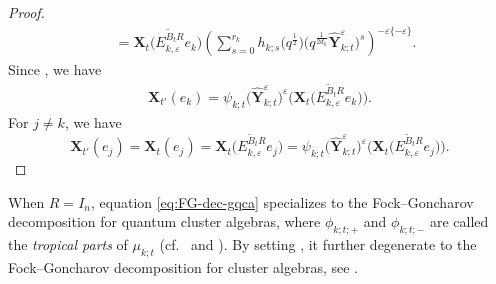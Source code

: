 \documentclass[10pt,a4paper]{amsart}
\numberwithin{equation}{section}
\begin{document}
\begin{proof}
\begin{align*}
 &=\mathbf{X}_{t}\bigl(E^{\tilde{B}_{t}R}_{k,\varepsilon}e_{k}\bigr)\left(\sum\limits^{r_{k}}_{s=0}h_{k;s}\bigl(q^{\frac{1}{2}}\bigr)\bigl(q^{\frac{1}{2d_{k}}}\mathbf{\hat{Y}}_{k;t}^{\varepsilon}\bigr)^{s}\right)^{-\varepsilon\{-\varepsilon\}}.
 \end{align*}
 Since , we have
 \begin{align*}
 \mathbf{X}_{t'}(e_{k})=\psi_{k;t}\bigl(\mathbf{\hat{Y}}_{k;t}^{\varepsilon}\bigr)^{\varepsilon}\bigl(\mathbf{X}_{t}\bigl(E^{\tilde{B}_{t}R}_{k,\varepsilon}e_{k}\bigr)\bigr).
 \end{align*}
 For $j\neq k$, we have
 \[
 \mathbf{X}_{t'}(e_{j})
 =\mathbf{X}_{t}(e_{j})
 =\mathbf{X}_{t}\bigl(E^{\tilde{B}_{t}R}_{k,\varepsilon}e_{j}\bigr)
 =\psi_{k;t}\bigl(\mathbf{\hat{Y}}_{k;t}^{\varepsilon}\bigr)^{\varepsilon}\bigl(\mathbf{X}_{t}\bigl(E^{\tilde{B}_{t}R}_{k,\varepsilon}e_{j}\bigr)\bigr).\tag*{\qed}
 \]\renewcommand{\qed}{}
\end{proof}

\begin{Remark}
When $R=I_n$, equation \eqref{eq:FG-dec-gqca} specializes to the Fock--Goncharov decomposition for quantum cluster algebras, where $\phi_{k;t;+}$ and $\phi_{k;t;-}$ are called the {\it tropical parts} of $\mu_{k;t}$ (cf.\ \cite[Section 3.3]{fock2009} and \cite[Section 6.3]{Keller2012}). By setting , it further degenerate to the Fock--Goncharov decomposition for cluster algebras, see \cite[Section 2.3]{LMN2023}.
\end{Remark}
\end{document}
